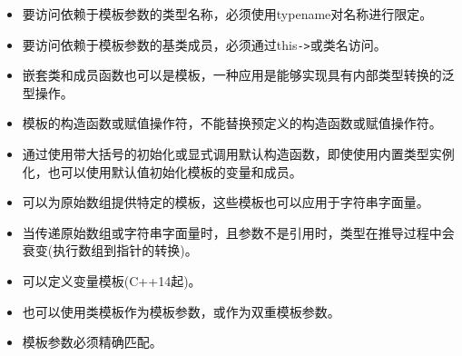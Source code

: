 
\begin{itemize}
\item 
要访问依赖于模板参数的类型名称，必须使用typename对名称进行限定。

\item 
要访问依赖于模板参数的基类成员，必须通过this\texttt{->}或类名访问。

\item 
嵌套类和成员函数也可以是模板，一种应用是能够实现具有内部类型转换的泛型操作。

\item 
模板的构造函数或赋值操作符，不能替换预定义的构造函数或赋值操作符。

\item 
通过使用带大括号的初始化或显式调用默认构造函数，即使使用内置类型实例化，也可以使用默认值初始化模板的变量和成员。

\item 
可以为原始数组提供特定的模板，这些模板也可以应用于字符串字面量。

\item 
当传递原始数组或字符串字面量时，且参数不是引用时，类型在推导过程中会衰变(执行数组到指针的转换)。

\item 
可以定义变量模板(C++14起)。

\item 
也可以使用类模板作为模板参数，或作为双重模板参数。

\item 
模板参数必须精确匹配。
\end{itemize}
